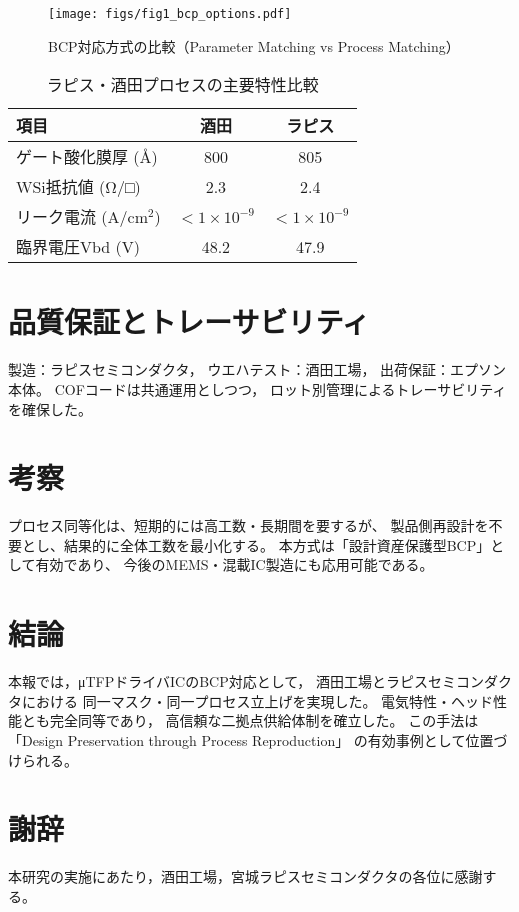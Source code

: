 \documentclass[conference]{IEEEtran}
\begin{document}
\begin{figure}[htbp]
\centering
\texttt{[image: figs/fig1\_bcp\_options.pdf]}
\caption{BCP対応方式の比較（Parameter Matching vs Process Matching）}
\end{figure}

\begin{table}[htbp]
\centering
\caption{ラピス・酒田プロセスの主要特性比較}
\begin{tabular}{lcc}
\hline
項目 & 酒田 & ラピス \\
\hline
ゲート酸化膜厚 (Å) & 800 & 805 \\
WSi抵抗値 (Ω/□) & 2.3 & 2.4 \\
リーク電流 (A/cm$^2$) & $<1\times10^{-9}$ & $<1\times10^{-9}$ \\
臨界電圧Vbd (V) & 48.2 & 47.9 \\
\hline
\end{tabular}
\end{table}

\section{品質保証とトレーサビリティ}
製造：ラピスセミコンダクタ，
ウエハテスト：酒田工場，
出荷保証：エプソン本体。
COFコードは共通運用としつつ，
ロット別管理によるトレーサビリティを確保した。

\section{考察}
プロセス同等化は、短期的には高工数・長期間を要するが、
製品側再設計を不要とし、結果的に全体工数を最小化する。
本方式は「設計資産保護型BCP」として有効であり、
今後のMEMS・混載IC製造にも応用可能である。

\section{結論}
本報では，μTFPドライバICのBCP対応として，
酒田工場とラピスセミコンダクタにおける
同一マスク・同一プロセス立上げを実現した。
電気特性・ヘッド性能とも完全同等であり，
高信頼な二拠点供給体制を確立した。
この手法は「Design Preservation through Process Reproduction」
の有効事例として位置づけられる。

\section*{謝辞}
本研究の実施にあたり，酒田工場，宮城ラピスセミコンダクタの各位に感謝する。
\end{document}
